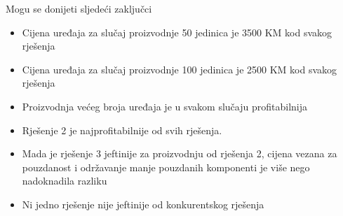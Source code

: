 \documentclass[12pt]{article}
\begin{document}
Mogu se donijeti sljedeći zaključci
\begin{itemize}
\item Cijena uređaja za slučaj proizvodnje 50 jedinica je 3500 KM kod svakog rješenja
\item Cijena uređaja za slučaj proizvodnje 100 jedinica je 2500 KM kod svakog rješenja
\item Proizvodnja većeg broja uređaja je u svakom slučaju profitabilnija
\item Rješenje 2 je najprofitabilnije od svih rješenja.
\item Mada je rješenje 3 jeftinije za proizvodnju od rješenja 2, cijena vezana za pouzdanost i održavanje manje pouzdanih komponenti je više nego nadoknadila razliku
\item Ni jedno rješenje nije jeftinije od konkurentskog rješenja
\end{itemize}
\end{document}
